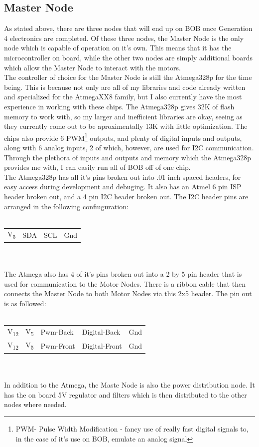 \documentclass{article}
\begin{document}
\subsection{Master Node}
As stated above, there are three nodes that will end up on BOB once Generation 4 electronics are completed. Of these three nodes, the Master Node is the only node which is capable of operation on it's own. This means that it has the microcontroller on board, while the other two nodes are simply additional boards which allow the Master Node to interact with the motors.\\
The controller of choice for the Master Node is still the Atmega328p for the time being. This is because not only are all of my libraries and code already written and specialized for the AtmegaXX8 family, but I also currently have the most experience in working with these chips. The Atmega328p gives 32K of flash memory to work with, so my larger and inefficient libraries are okay, seeing as they currently come out to be aproximentally 13K with little optimization. The chips also provide 6 PWM\footnote{PWM- Pulse Width Modification - fancy use of really fast digital signals to, in the case of it's use on BOB, emulate an analog signal} outputs, and plenty of digital inputs and outputs, along with 6 analog inputs, 2 of which, however, are used for I2C communication. Through the plethora of inputs and outputs and memory which the Atmega328p provides me with, I can easily run all of BOB off of one chip.\\
The Atmega328p has all it's pins broken out into .01 inch spaced headers, for easy access during development and debuging. It also has an Atmel 6 pin ISP header broken out, and a 4 pin I2C header broken out. The I2C header pins are arranged in the following confiuguration:\\
\\
\begin{tabular}{ l | l | l | l }
V\textsubscript{5} & SDA & SCL & Gnd \\
\end{tabular}\\
\\
The Atmega also has 4 of it's pins broken out into a 2 by 5 pin header that is used for communication to the Motor Nodes. There is a ribbon cable that then connects the Master Node to both Motor Nodes via this 2x5 header. The pin out is as followed:\\
\\
\begin{tabular}{ l | l | l | l | l }
V\textsubscript{12} & V\textsubscript{5} & Pwm-Back & Digital-Back & Gnd \\
V\textsubscript{12} & V\textsubscript{5} & Pwm-Front & Digital-Front & Gnd \\
\end{tabular}\\
\\
In addition to the Atmega, the Maste Node is also the power distribution node. It has the on board 5V regulator and filters which is then distributed to the other nodes where needed.\\
\end{document}
